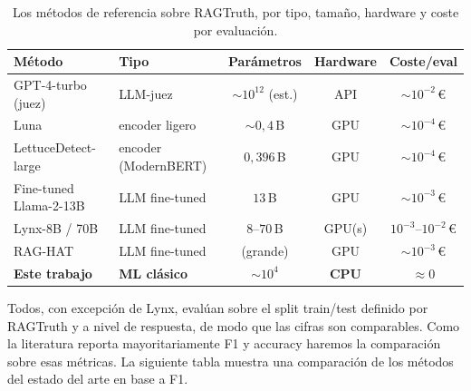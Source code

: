 \documentclass[12pt,a4paper]{report}
\theoremstyle{definition}
\begin{document}
\begin{table}[H]
\centering
\small
\begin{tabular}{lp{2.7cm}ccc}
\toprule
Método & Tipo & Parámetros & Hardware & Coste/eval \\
\midrule
GPT-4-turbo (juez) & LLM-juez & ${\sim}10^{12}$ (est.) & API & ${\sim}10^{-2}$\,\euro \\
Luna & encoder ligero & ${\sim}0{,}4$\,B & GPU & ${\sim}10^{-4}$\,\euro \\
LettuceDetect-large & encoder (ModernBERT) & $0{,}396$\,B & GPU & ${\sim}10^{-4}$\,\euro \\
Fine-tuned Llama-2-13B & LLM fine-tuned & $13$\,B & GPU & ${\sim}10^{-3}$\,\euro \\
Lynx-8B / 70B & LLM fine-tuned & $8$--$70$\,B & GPU(s) & $10^{-3}$--$10^{-2}$\,\euro \\
RAG-HAT & LLM fine-tuned & (grande) & GPU & ${\sim}10^{-3}$\,\euro \\
\midrule
\textbf{Este trabajo} & \textbf{ML clásico} & $\sim\!10^{4}$ & \textbf{CPU} & \textbf{$\approx 0$} \\
\bottomrule
\end{tabular}
\caption{Los métodos de referencia sobre RAGTruth, por tipo, tamaño, hardware y coste por
evaluación.}
\label{tab:sota-def}
\end{table}

Todos, con excepción de Lynx, evalúan sobre el split train/test definido por RAGTruth y a nivel de respuesta, de modo que las cifras
son comparables. Como la literatura
reporta mayoritariamente F1 y accuracy haremos la comparación sobre esas métricas. La siguiente tabla muestra una comparación de los métodos del estado del arte en base a F1.
\end{document}
